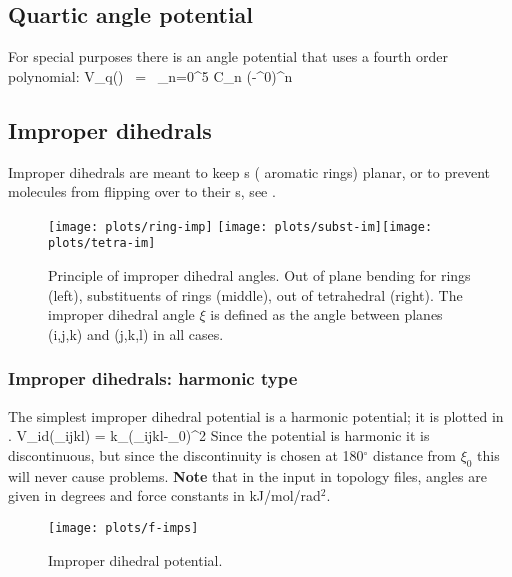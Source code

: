 \subsection{Quartic angle potential}
\label{subsec:quarticangle}
For special purposes there is an angle potential
that uses a fourth order polynomial:
\beq
V_q(\tijk) ~=~ \sum_{n=0}^5 C_n (\tijk-\tijk^0)^n
\eeq

\newcommand{\rvkj}{{\bf r}_{kj}}
\newcommand{\rkj}{r_{kj}}

\subsection{Improper dihedrals}
\label{sec:imp}
Improper dihedrals are meant to keep s ({\eg} 
aromatic rings) planar, or to prevent molecules from flipping over to their
s, see .

\begin {figure}
\centerline{\texttt{[image: plots/ring-imp]}\hspace{1cm}
\texttt{[image: plots/subst-im]}\hspace{1cm}\texttt{[image: plots/tetra-im]}}
\caption[Improper dihedral angles.]{Principle of improper
dihedral angles. Out of plane bending for rings (left), substituents
of rings (middle), out of tetrahedral (right). The improper dihedral
angle $\xi$ is defined as the angle between planes (i,j,k) and (j,k,l)
in all cases.}
\label{fig:imp}
\end {figure}

\subsubsection{Improper dihedrals: harmonic type}
\label{subsec:harmonicimproperdihedral}
The simplest improper dihedral potential is a harmonic potential; it is plotted in
.
\beq
V_{id}(\xi_{ijkl}) = \half k_{\xi}(\xi_{ijkl}-\xi_0)^2
\eeq
Since the potential is harmonic it is discontinuous,
but since the discontinuity is chosen at 180$^\circ$ distance from $\xi_0$
this will never cause problems.
{\bf Note} that in the input in topology files, angles are given in degrees and
force constants in kJ/mol/rad$^2$.

\begin{figure}
\centerline{\texttt{[image: plots/f-imps]}}
\caption{Improper dihedral potential.}
\label{fig:imps}
\end{figure}

